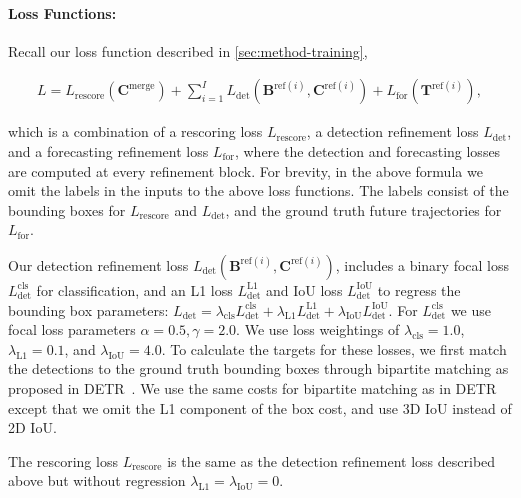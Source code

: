 \paragraph{Loss Functions:}

Recall our loss function described in \cref{sec:method-training},
\begin{footnotesize}
\begin{align}
L = L_{\mathrm{rescore}}(\mathbf{C}^\mathrm{merge}) + \sum_{i=1}^I L_{\mathrm{det}}(\mathbf{B}^{\mathrm{ref}(i)}, \mathbf{C}^{\mathrm{ref}(i)}) + L_{\mathrm{for}}(\mathbf{T}^{\mathrm{ref}(i)}),
\end{align}
\end{footnotesize}
which is a combination of
a rescoring loss $L_\mathrm{rescore}$,
a detection refinement loss $L_\mathrm{det}$,
and a forecasting refinement loss $L_\mathrm{for}$, where the detection and forecasting losses are computed at every refinement block.
For brevity, in the above formula we omit the labels in the inputs to the above loss functions.
The labels consist of the bounding boxes for $L_\mathrm{rescore}$ and $L_\mathrm{det}$,
and the ground truth future trajectories for $L_\mathrm{for}$.

Our detection refinement loss $L_\textrm{det}(\mathbf{B}^{\mathrm{ref}(i)}, \mathbf{C}^{\mathrm{ref}(i)})$,
includes a binary focal loss $L_\textrm{det}^\textrm{cls}$ for classification,
and an L1 loss $L_\textrm{det}^\textrm{L1}$ and IoU loss $L_\textrm{det}^\textrm{IoU}$ to regress
the bounding box parameters: $L_\textrm{det} = \lambda_\mathrm{cls} L_\textrm{det}^\textrm{cls} + \lambda_\mathrm{L1} L_\textrm{det}^\textrm{L1} + \lambda_\mathrm{IoU} L_\textrm{det}^\textrm{IoU}$.
For $L_\textrm{det}^\textrm{cls}$ we use focal loss parameters $\alpha = 0.5, \gamma = 2.0$.
We use loss weightings of $\lambda_\mathrm{cls} = 1.0$, $\lambda_\mathrm{L1} = 0.1$, and $\lambda_\mathrm{IoU} = 4.0$.
To calculate the targets for these losses, we first match the detections to the ground truth bounding boxes through bipartite matching as proposed in DETR~\cite{carion2020end}.
We use the same costs for bipartite matching as in DETR except that we omit the L1 component of the box cost, and use 3D IoU instead of 2D IoU.

The rescoring loss $L_\mathrm{rescore}$ is the same as the detection refinement loss described above but without regression $\lambda_{\mathrm{L1}} = \lambda_{\mathrm{IoU}} = 0$.

